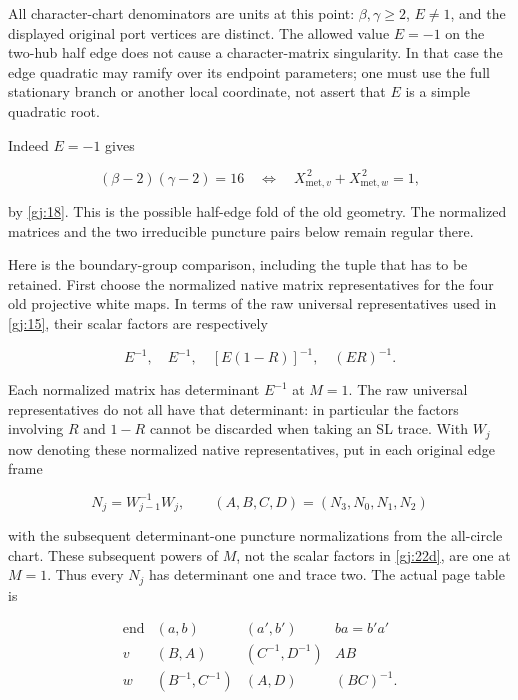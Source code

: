 All character-chart denominators are units at this point: \(\beta,\gamma\ge2\), \(E\ne1\), and the displayed original port vertices are distinct. The allowed value \(E=-1\) on the two-hub half edge does not cause a character-matrix singularity. In that case the edge quadratic may ramify over its endpoint parameters; one must use the full stationary branch or another local coordinate, not assert that \(E\) is a simple quadratic root.

Indeed \(E=-1\) gives

\begin{equation}\label{gj:22e}
(\beta-2)(\gamma-2)=16
 \quad\Longleftrightarrow\quad
 X_{\mathrm{met},v}^{\,2}+X_{\mathrm{met},w}^{\,2}=1,
\end{equation}

by \eqref{gj:18}. This is the possible half-edge fold of the old geometry.
The normalized matrices and the two irreducible puncture pairs
below remain regular there.

Here is the boundary-group comparison, including the tuple that has to be retained. First choose the normalized native matrix representatives for the four old projective white maps. In terms of the raw universal representatives used in \eqref{gj:15}, their scalar factors are respectively

\begin{equation}\label{gj:22d}
E^{-1},\quad E^{-1},\quad
                [E(1-R)]^{-1},\quad (ER)^{-1}.
\end{equation}

Each normalized matrix has determinant \(E^{-1}\) at \(M=1\).
The raw universal representatives do not all have that determinant:
in particular the factors involving \(R\) and \(1-R\) cannot be
discarded when taking an SL trace. With \(W_j\) now denoting these
normalized native representatives, put in each original edge frame

\begin{equation}\label{gj:22a}
N_j=W_{j-1}^{-1}W_j,\qquad
 (A,B,C,D)=(N_3,N_0,N_1,N_2)
\end{equation}

with the subsequent determinant-one puncture normalizations from the
all-circle chart. These subsequent powers of \(M\), not the scalar
factors in \eqref{gj:22d}, are one at \(M=1\). Thus every \(N_j\) has determinant
one and trace two. The actual page table is

\begin{equation}\label{gj:22b}
\begin{array}{c|c|c|c}
\text{end}&(a,b)&(a',b')&ba=b'a'\\ \hline
v&(B,A)&(C^{-1},D^{-1})&AB\\
w&(B^{-1},C^{-1})&(A,D)&(BC)^{-1}.
\end{array}
\end{equation}

